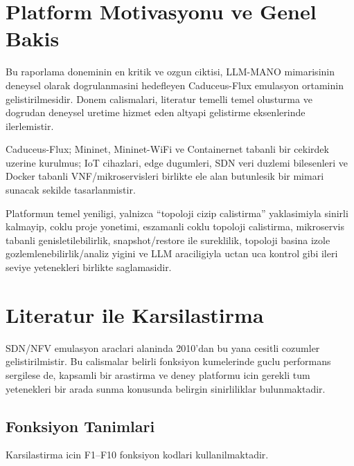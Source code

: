 \documentclass[conference]{IEEEtran}
\begin{document}
\section{Platform Motivasyonu ve Genel Bakis}
Bu raporlama doneminin en kritik ve ozgun ciktisi, LLM-MANO mimarisinin deneysel olarak dogrulanmasini hedefleyen Caduceus-Flux emulasyon ortaminin gelistirilmesidir. Donem calismalari, literatur temelli temel olusturma ve dogrudan deneysel uretime hizmet eden altyapi gelistirme eksenlerinde ilerlemistir.

Caduceus-Flux; Mininet, Mininet-WiFi ve Containernet tabanli bir cekirdek uzerine kurulmus; IoT cihazlari, edge dugumleri, SDN veri duzlemi bilesenleri ve Docker tabanli VNF/mikroservisleri birlikte ele alan butunlesik bir mimari sunacak sekilde tasarlanmistir.

Platformun temel yeniligi, yalnizca ``topoloji cizip calistirma'' yaklasimiyla sinirli kalmayip, coklu proje yonetimi, eszamanli coklu topoloji calistirma, mikroservis tabanli genisletilebilirlik, snapshot/restore ile sureklilik, topoloji basina izole gozlemlenebilirlik/analiz yigini ve LLM araciligiyla uctan uca kontrol gibi ileri seviye yetenekleri birlikte saglamasidir.

\section{Literatur ile Karsilastirma}
SDN/NFV emulasyon araclari alaninda 2010'dan bu yana cesitli cozumler gelistirilmistir. Bu calismalar belirli fonksiyon kumelerinde guclu performans sergilese de, kapsamli bir arastirma ve deney platformu icin gerekli tum yetenekleri bir arada sunma konusunda belirgin sinirliliklar bulunmaktadir.

\subsection{Fonksiyon Tanimlari}
Karsilastirma icin F1--F10 fonksiyon kodlari kullanilmaktadir.
\end{document}
